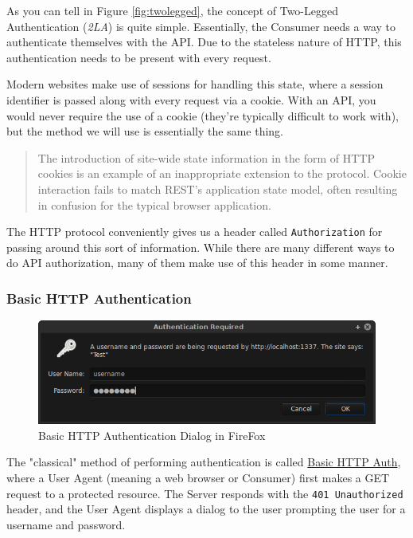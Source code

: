 \documentclass{book}
\begin{document}
As you can tell in Figure \ref{fig:twolegged}, the concept of Two-Legged Authentication (\emph{2LA}) is quite simple. Essentially, the Consumer needs a way to authenticate themselves with the API. Due to the stateless nature of HTTP, this authentication needs to be present with every request.

Modern websites make use of sessions for handling this state, where a session identifier is passed along with every request via a cookie. With an API, you would never require the use of a cookie (they're typically difficult to work with), but the method we will use is essentially the same thing.

\begin{quote}
The introduction of site-wide state information in the form of HTTP cookies is an example of an inappropriate extension to the protocol. Cookie interaction fails to match REST’s application state model, often resulting in confusion for the typical browser application.\cite[Page 145]{acmv2n2}
\end{quote}

The HTTP protocol conveniently gives us a header called \texttt{Authorization} for passing around this sort of information. While there are many different ways to do API authorization, many of them make use of this header in some manner.

\subsubsection{Basic HTTP Authentication}

\begin{figure}[ht!]
\centering
\includegraphics[width=120mm]{images/basic-http-auth.png}
\caption{Basic HTTP Authentication Dialog in FireFox}
\label{fig:basichhtpauth}
\end{figure}

The "classical" method of performing authentication is called \href{https://tools.ietf.org/html/rfc2617}{Basic HTTP Auth}, where a User Agent (meaning a web browser or Consumer) first makes a GET request to a protected resource. The Server responds with the \texttt{401 Unauthorized} header, and the User Agent displays a dialog to the user prompting the user for a username and password.
\end{document}

